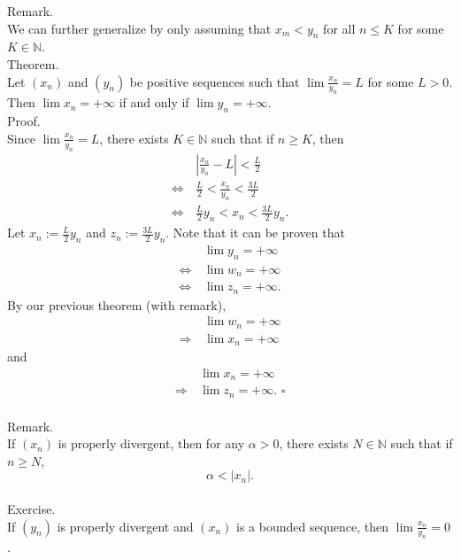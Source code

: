 \documentclass[twocolumn]{article}
\newcommand{\qed}{$\square$}
\newcommand{\naturals}{\mathbb{N}}
\begin{document}
Remark. \\
We can further generalize by only assuming that $x_m < y_n$ for all $n \leq K$ for some $K \in \naturals$. \\

Theorem. \\
Let $(x_n)$ and $(y_n)$ be positive sequences such that $\lim \frac{x_n}{y_n} = L$ for some $L > 0$. Then $\lim x_n = +\infty$ if and only if $\lim y_n = +\infty$. \\
Proof. \\
Since $\lim \frac{x_n}{y_n} = L$, there exists $K \in \naturals$ such that if $n \geq K$, then
\begin{align*}
					&|\frac{x_n}{y_n} - L| < \frac{L}{2} \\
\Leftrightarrow\, 	&\frac{L}{2} < \frac{x_n}{y_n} < \frac{3L}{2} \\
\Leftrightarrow\,	&\frac{L}{2} y_n < x_n < \frac{3L}{2} y_n \text{.}
\end{align*}
Let $x_n := \frac{L}{2} y_n$ and $z_n := \frac{3L}{2} y_n$. Note that it can be proven that
\begin{align*}
					&\lim y_n = +\infty \\
\Leftrightarrow\, 	&\lim w_n = +\infty \\
\Leftrightarrow\,	&\lim z_n = +\infty \text{.}
\end{align*}
By our previous theorem (with remark),
\begin{align*}
				&\lim w_n = +\infty \\
\Rightarrow\, 	&\lim x_n = +\infty
\end{align*}
and
\begin{align*}
				&\lim x_n = +\infty \\
\Rightarrow\, 	&\lim z_n = +\infty \text{. \qed}
\end{align*} \\

Remark. \\
If $(x_n)$ is properly divergent, then for any $\alpha > 0$, there exists $N \in \naturals$ such that if $n \geq N$,
$$\alpha < |x_n| \text{.}$$ \\

Exercise. \\
If $(y_n)$ is properly divergent and $(x_n)$ is a bounded sequence, then $\lim \frac{x_n}{y_n} = 0$. \\
\end{document}
